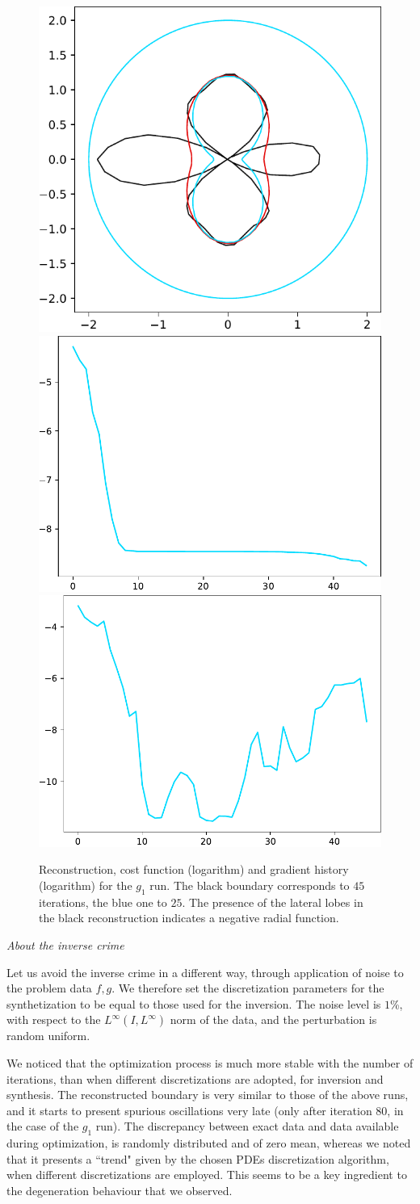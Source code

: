 \documentclass[english,a4paper,9pt,oneside]{scrbook}	%
\theoremstyle{break}
\theoremstyle{remark}
\begin{document}
\begin{figure}[H]
\centering
\includegraphics[height=0.25\columnwidth]{Images/comparison_25_45_euler.pdf}
\includegraphics[height=0.25\columnwidth]{Images/hourglass_constant_euler/cost_function_45.pdf}
\includegraphics[height=0.25\columnwidth]{Images/hourglass_constant_euler/gradient_infty_norm_45.pdf}
\caption{Reconstruction, cost function (logarithm) and gradient history (logarithm) for the $g_1$ run. The black boundary corresponds to $45$ iterations, the blue one to $25$. The presence of the lateral lobes in the black reconstruction indicates a negative radial function.}\label{fig:degenerate_euler}
\end{figure}

\textit{About the inverse crime}

Let us avoid the inverse crime in a different way, through application of noise to the problem data $f,g$. We therefore set the discretization parameters for the synthetization to be equal to those used for the inversion. The noise level is $1$\%, with respect to the $L^\infty(I,L^\infty)$ norm of the data, and the perturbation is random uniform. 

We noticed that the optimization process is much more stable with the number of iterations, than when different discretizations are adopted, for inversion and synthesis. The reconstructed boundary is very similar to those of the above runs, and it starts to present spurious oscillations  very late (only after iteration $80$, in the case of the $g_1$ run). The discrepancy between exact data and data available during optimization, is randomly distributed and of zero mean, whereas we noted that it presents a ``trend" given by the chosen PDEs discretization algorithm, when different discretizations are employed. This seems to be a key ingredient to the degeneration behaviour that we observed. 
\end{document}

